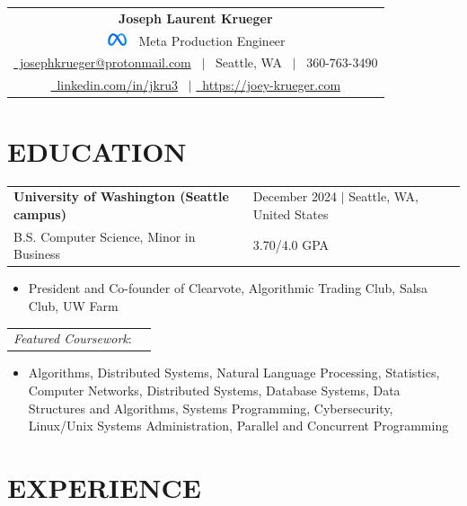 \documentclass[10.5pt,letterpaper]{article}
\makeatletter
\newcommand{\header}[2]{
    \noindent
    \begin{tabularx}{\linewidth}{@{} C @{}}
        \Huge\textbf{Joseph Laurent Krueger} \\[5pt]
        #1 \ {\Large #2} \\[5pt]
        \href{mailto:josephfkrueger@protonmail.com}{{\color{primarycolor}\faEnvelope}\ josephkrueger@protonmail.com} \ $|$ 
        {{\color{primarycolor}\faMapPin}\ Seattle, WA} \ $|$ 
        {{\color{primarycolor}\faMobile}\ 360-763-3490} \\[3pt]
        \href{https://linkedin.com/in/jkru3}{{\color{primarycolor}\faLinkedin}\ linkedin.com/in/jkru3} \ $|$ 
        \href{https://joey-krueger.com}{{\color{primarycolor}\faGlobeAmericas}\ https://joey-krueger.com}
    \end{tabularx}
}
\newcommand{\educationentry}[5]{
    \begin{tabularx}{\textwidth}{lX}
        \textbf{#1} & \hfill {\textcolor{primarycolor}{#3}} $|$ #4 \\[0pt]
        #2 & \hfill #5 \\[0pt]
    \end{tabularx}
}
\makeatother
\begin{document}
\header{\includegraphics[height=1em]{../logos/meta.png}}{Meta Production Engineer}
\vspace{-10pt}

\section{\faGraduationCap{ }EDUCATION}
\vspace{4pt}
\educationentry{University of Washington (Seattle campus)}{B.S. Computer Science, Minor in Business}{December 2024}{Seattle, WA, United States}{3.70/4.0 GPA}
\begin{itemize}[leftmargin=1.5em, nosep, noitemsep] %
  \item[] President and Co-founder of Clearvote, Algorithmic Trading Club, Salsa Club, UW Farm
\end{itemize}
\begin{tabularx}{\textwidth}{lX}
  \textit{Featured Coursework}: & \\ 
\end{tabularx}
\begin{itemize}[leftmargin=1.5em, nosep, noitemsep] %
  \item[] 
  Algorithms, 
  Distributed Systems, 
  Natural Language Processing, 
  Statistics,
  Computer Networks,
  Distributed Systems,
  Database Systems,
  Data Structures and Algorithms,
  Systems Programming,
  Cybersecurity,
  Linux/Unix Systems Administration,
  Parallel and Concurrent Programming
\end{itemize}
\vspace{-20pt}

\section{\faCode{ }EXPERIENCE}
\vspace{4pt}



% 
\vspace{-10pt}
\end{document}
